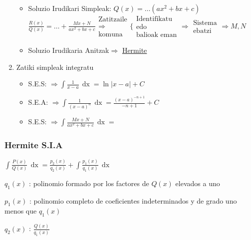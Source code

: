 \documentclass[8pt]{article}
\DeclareMathOperator{\xder}{\, \mathrm{d}x}
\begin{document}
\begin{enumerate}
\begin{itemize}
						\item Soluzio Irudikari Simpleak: $ Q(x) = \dots (a x^2 + b x + c) $
							$ \frac{R(x)}{Q(x)} = \dots +
							\frac{Mx + N}{a x^2 + b x + c}
							\begin{array}{c}
								\text{Zatitzaile}\\
								\Rightarrow\\
								\text{komuna}
							\end{array}
							\Bigg \{
							\begin{array}{c}
								\text{Identifikatu}\\
								\text{edo}\\
								\text{balioak eman}
							\end{array}
							\Rightarrow
							\begin{array}{c}
								\text{Sistema}\\
								\text{ebatzi}
							\end{array} \Rightarrow M, N $
						\item Soluzio Irudikaria Anitzak$ \Rightarrow $ \underline{Hermite}
					\end{itemize} 

				\item Zatiki simpleak integratu
					\begin{itemize}
						\item S.E.S: $ \Rightarrow \int \frac{1}{x-a} \xder = \ln |x-a| + C $
						\item S.E.A: $ \Rightarrow \int \frac{1}{(x-a)^n} \xder = \frac{(x-a)^{-n+1}}{-n+1} + C $
						\item S.E.S: $ \Rightarrow \int \frac{Mx+N}{a x^2 + b x + c} \xder = $
					\end{itemize}

			\end{enumerate}
		\subsubsection{Hermite S.I.A}
			$ \int \frac{P(x)}{Q(x)} \xder = \frac{p_2 (x)}{q_2 (x)} + \int \frac{p_1 (x)}{q_1 (x)} \xder $

			$ q_1 (x) $ : polinomio formado por los factores de $ Q(x) $ elevados a uno

			$ p_1 (x) $ : polinomio completo de coeficientes indeterminados y de grado uno menos que $ q_1 (x) $

			$ q_2 (x) $ : $ \frac{Q(x)}{q_1 (x)} $
\end{document}
